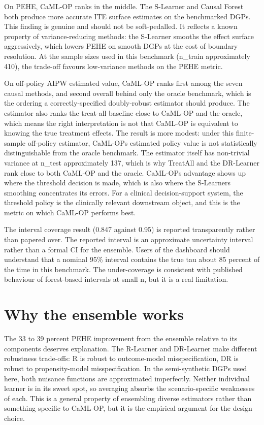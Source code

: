 On PEHE, CaML-OP ranks in the middle. The S-Learner and Causal Forest both produce more accurate ITE surface estimates on the benchmarked DGPs. This finding is genuine and should not be soft-pedalled. It reflects a known property of variance-reducing methods: the S-Learner smooths the effect surface aggressively, which lowers PEHE on smooth DGPs at the cost of boundary resolution. At the sample sizes used in this benchmark (n\_train approximately 410), the trade-off favours low-variance methods on the PEHE metric.

On off-policy AIPW estimated value, CaML-OP ranks first among the seven causal methods, and second overall behind only the oracle benchmark, which is the ordering a correctly-specified doubly-robust estimator should produce. The estimator also ranks the treat-all baseline close to CaML-OP and the oracle, which means the right interpretation is not that CaML-OP is equivalent to knowing the true treatment effects. The result is more modest: under this finite-sample off-policy estimator, CaML-OP\textquotesingle s estimated policy value is not statistically distinguishable from the oracle benchmark. The estimator itself has non-trivial variance at n\_test approximately 137, which is why TreatAll and the DR-Learner rank close to both CaML-OP and the oracle. CaML-OP\textquotesingle s advantage shows up where the threshold decision is made, which is also where the S-Learner\textquotesingle s smoothing concentrates its errors. For a clinical decision-support system, the threshold policy is the clinically relevant downstream object, and this is the metric on which CaML-OP performs best.

The interval coverage result (0.847 against 0.95) is reported transparently rather than papered over. The reported interval is an approximate uncertainty interval rather than a formal CI for the ensemble. Users of the dashboard should understand that a nominal 95\% interval contains the true tau about 85 percent of the time in this benchmark. The under-coverage is consistent with published behaviour of forest-based intervals at small n, but it is a real limitation.

\section{Why the ensemble works}\label{why-the-ensemble-works}

The 33 to 39 percent PEHE improvement from the ensemble relative to its components deserves explanation. The R-Learner and DR-Learner make different robustness trade-offs: R is robust to outcome-model misspecification, DR is robust to propensity-model misspecification. In the semi-synthetic DGPs used here, both nuisance functions are approximated imperfectly. Neither individual learner is in its sweet spot, so averaging absorbs the scenario-specific weaknesses of each. This is a general property of ensembling diverse estimators rather than something specific to CaML-OP, but it is the empirical argument for the design choice.

